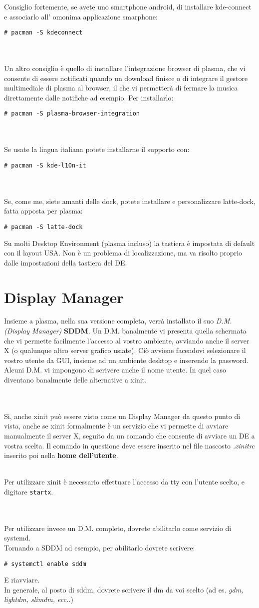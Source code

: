 \documentclass[twoside,italian]{book}
\newcommand{\code}[1]{\texttt{#1}}
\newcommand{\centcode}[1]{

\definecolor{codice}{rgb}{0.5,0.1,0.1}

	\begin{center}
		\color{codice}
		\code{#1}
	\end{center}


}
\newcommand{\nlinea}{
	\leavevmode
	\\
}
\begin{document}
	
			Consiglio fortemente, se avete uno smartphone android, di installare kde-connect e associarlo all' omonima applicazione smarphone:
			\centcode{\# pacman -S kdeconnect}
			\nlinea		
			\nlinea
			
			Un altro consiglio è quello di installare l'integrazione browser di plasma, che vi consente di essere notificati quando un download finisce o di integrare il gestore multimediale di plasma al browser, il che vi permetterà di fermare la musica direttamente dalle notifiche ad esempio. Per installarlo:\centcode{\# pacman -S plasma-browser-integration}
			
			\nlinea
			\nlinea
			
			Se usate la lingua italiana potete installarne il supporto con:\centcode{\# pacman -S kde-l10n-it}
			
			\nlinea
			\nlinea
			
			Se, come me, siete amanti delle dock, potete installare e personalizzare latte-dock, fatta apposta per plasma:
			\centcode{\# pacman -S latte-dock}
			
			\begin{tcolorbox}[floatplacement=b,width=\textwidth,colback={blue},title={NOTA BENE:},colbacktitle=gray,coltitle=white,colupper=white]
				Su molti Desktop Environment (plasma incluso) la tastiera è impostata di default con il layout USA. Non è un problema di localizzazione, ma va risolto proprio dalle impostazioni della tastiera del DE.
			\end{tcolorbox}
			
		\section{Display Manager}
			Insieme a plasma, nella sua versione completa, verrà installato il suo\textit{ D.M. (Display Manager)} \textbf{SDDM}. Un D.M. banalmente vi presenta quella schermata che vi permette facilmente l'accesso al vostro ambiente, avviando anche il server X (o qualunque altro server grafico usiate). Ciò avviene facendovi selezionare il vostro utente da GUI, insieme ad un ambiente desktop e inserendo la password. Alcuni D.M. vi impongono di scrivere anche il nome utente. In quel caso diventano banalmente delle alternative a xinit.
			\nlinea
			\nlinea
			
			Si, anche xinit può essere visto come un Display Manager da questo punto di vista, anche se xinit formalmente è un servizio che vi permette di avviare manualmente il server X, seguito da un comando che consente di avviare un DE a vostra scelta. Il comando in questione deve essere inserito nel file nascosto \textit{.xinitrc} inserito poi nella \textbf{home dell'utente}.
			\nlinea
			Per utilizzare xinit è necessario effettuare l'accesso da tty con l'utente scelto, e digitare \code{startx}.
			\nlinea
			\nlinea
			Per utilizzare invece un D.M. completo, dovrete abilitarlo come servizio di systemd.\\
			Tornando a SDDM ad esempio, per abilitarlo dovrete scrivere: \centcode{\# systemctl enable sddm}E riavviare.\\ In generale, al posto di sddm, dovrete scrivere il dm da voi scelto (ad es. \textit{gdm, lightdm, slimdm, ecc..})
			
\end{document}
